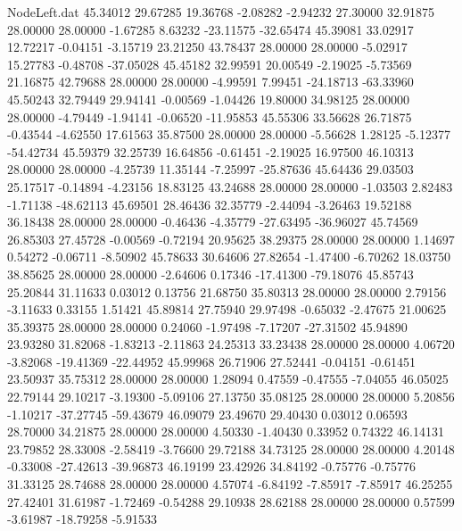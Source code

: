 \begin{filecontents}{NodeLeft.dat}
  45.34012   29.67285   19.36768    -2.08282   -2.94232   27.30000   32.91875   28.00000   28.00000   -1.67285    8.63232  -23.11575  -32.65474
  45.39081   33.02917   12.72217    -0.04151   -3.15719   23.21250   43.78437   28.00000   28.00000   -5.02917   15.27783   -0.48708  -37.05028
  45.45182   32.99591   20.00549    -2.19025   -5.73569   21.16875   42.79688   28.00000   28.00000   -4.99591    7.99451  -24.18713  -63.33960
  45.50243   32.79449   29.94141    -0.00569   -1.04426   19.80000   34.98125   28.00000   28.00000   -4.79449   -1.94141   -0.06520  -11.95853
  45.55306   33.56628   26.71875    -0.43544   -4.62550   17.61563   35.87500   28.00000   28.00000   -5.56628    1.28125   -5.12377  -54.42734
  45.59379   32.25739   16.64856    -0.61451   -2.19025   16.97500   46.10313   28.00000   28.00000   -4.25739   11.35144   -7.25997  -25.87636
  45.64436   29.03503   25.17517    -0.14894   -4.23156   18.83125   43.24688   28.00000   28.00000   -1.03503    2.82483   -1.71138  -48.62113
  45.69501   28.46436   32.35779    -2.44094   -3.26463   19.52188   36.18438   28.00000   28.00000   -0.46436   -4.35779  -27.63495  -36.96027
  45.74569   26.85303   27.45728    -0.00569   -0.72194   20.95625   38.29375   28.00000   28.00000    1.14697    0.54272   -0.06711   -8.50902
  45.78633   30.64606   27.82654    -1.47400   -6.70262   18.03750   38.85625   28.00000   28.00000   -2.64606    0.17346  -17.41300  -79.18076
  45.85743   25.20844   31.11633     0.03012    0.13756   21.68750   35.80313   28.00000   28.00000    2.79156   -3.11633    0.33155    1.51421
  45.89814   27.75940   29.97498    -0.65032   -2.47675   21.00625   35.39375   28.00000   28.00000    0.24060   -1.97498   -7.17207  -27.31502
  45.94890   23.93280   31.82068    -1.83213   -2.11863   24.25313   33.23438   28.00000   28.00000    4.06720   -3.82068  -19.41369  -22.44952
  45.99968   26.71906   27.52441    -0.04151   -0.61451   23.50937   35.75312   28.00000   28.00000    1.28094    0.47559   -0.47555   -7.04055
  46.05025   22.79144   29.10217    -3.19300   -5.09106   27.13750   35.08125   28.00000   28.00000    5.20856   -1.10217  -37.27745  -59.43679
  46.09079   23.49670   29.40430     0.03012    0.06593   28.70000   34.21875   28.00000   28.00000    4.50330   -1.40430    0.33952    0.74322
  46.14131   23.79852   28.33008    -2.58419   -3.76600   29.72188   34.73125   28.00000   28.00000    4.20148   -0.33008  -27.42613  -39.96873
  46.19199   23.42926   34.84192    -0.75776   -0.75776   31.33125   28.74688   28.00000   28.00000    4.57074   -6.84192   -7.85917   -7.85917
  46.25255   27.42401   31.61987    -1.72469   -0.54288   29.10938   28.62188   28.00000   28.00000    0.57599   -3.61987  -18.79258   -5.91533

\end{filecontents}
